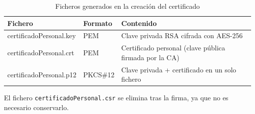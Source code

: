 \begin{table}[H]
    \centering
    \caption{Ficheros generados en la creación del certificado}
    \begin{tabularx}{\textwidth}{l|l|X}
        \toprule
        \textbf{Fichero} & \textbf{Formato} & \textbf{Contenido} \\
        \midrule
        certificadoPersonal.key & PEM & Clave privada RSA cifrada con AES-256 \\
        certificadoPersonal.crt & PEM & Certificado personal (clave pública firmada por la CA) \\
        certificadoPersonal.p12 & PKCS\#12 & Clave privada + certificado en un solo fichero \\
        \bottomrule
    \end{tabularx}
\end{table}

El fichero \texttt{certificadoPersonal.csr} se elimina tras la firma, ya que no es necesario conservarlo.
